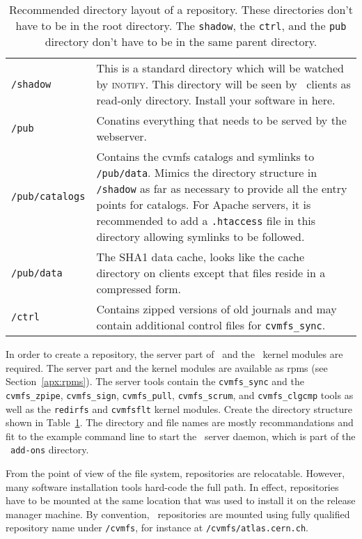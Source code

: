 \begin{table}
	\begin{tabularx}{\linewidth}{lX}
		\lstinline{/shadow} & This is a standard directory which will be watched by {\scshape inotify}. This directory will be seen by \cvmfs\ clients as read-only directory.  Install your software in here.\\
		\lstinline{/pub} & Conatins everything that needs to be served by the webserver. \\
		\lstinline{/pub/catalogs} & Contains the cvmfs catalogs and symlinks to \lstinline{/pub/data}.  Mimics the directory structure in \lstinline{/shadow} as far as necessary to provide all the entry points for catalogs.  For Apache servers, it is recommended to add a \lstinline{.htaccess} file in this directory allowing symlinks to be followed. \\
		\lstinline{/pub/data} & The SHA1 data cache, looks like the cache directory on clients except that files reside in a compressed form.\\
		\lstinline{/ctrl} & Contains zipped versions of old journals and may contain additional control files for \texttt{cvmfs\_sync}. \\
	\end{tabularx}
	\caption{Recommended directory layout of a repository.  These directories don't have to be in the root directory.  The \texttt{shadow}, the \texttt{ctrl}, and the \texttt{pub} directory don't have to be in the same parent directory.}
	\label{tab:journaldirs}
\end{table}

In order to create a repository, the server part of \cvmfs\ and the \cvmfs\ kernel modules are required.
The server part and the kernel modules are available as rpms (see Section~\ref{apx:rpms}).
The server tools contain the \texttt{cvmfs\_sync} and the \texttt{cvmfs\_zpipe}, \texttt{cvmfs\_sign}, \texttt{cvmfs\_pull}, \texttt{cvmfs\_scrum}, and \texttt{cvmfs\_clgcmp} tools as well as the \texttt{redirfs} and \texttt{cvmfsflt} kernel modules.
Create the directory structure shown in Table~\ref{tab:journaldirs}.
The directory and file names are mostly recommandations and fit to the example command line to start the \cvmfs\ server daemon, which is part of the \cvmfs\ \texttt{add-ons} directory.

From the point of view of the file system, repositories are relocatable.
However, many software installation tools hard-code the full path.
In effect, repositories have to be mounted at the same location that was used to install it on the release manager machine.
By convention, \cvmfs\ repositories are mounted using  fully qualified repository name under \texttt{/cvmfs}, for instance at \texttt{/cvmfs/atlas.cern.ch}.

